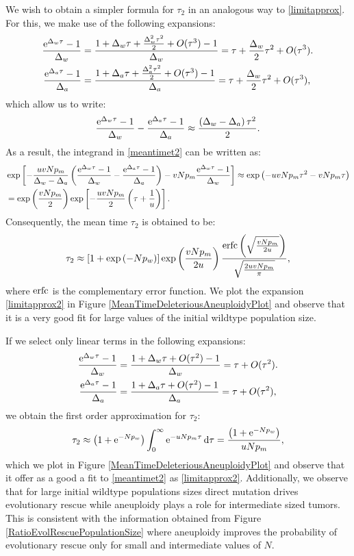 \documentclass[12pt]{extarticle}
\renewcommand{\d}{{\rm d}}
\newcommand{\e}{{\rm e}}
\newcommand{\erfc}{{\rm erfc}}
\begin{document}
We wish to obtain a simpler formula for $\tau_2$ in an analogous way to \eqref{limitapprox}. For this, we make use of the following expansions:
\begin{align*}
\frac{\e^{\Delta_w\tau}-1}{\Delta_w}&=\frac{1+\Delta_w\tau+\frac{\Delta_w^2\tau^2}{2}+O(\tau^3)-1}{\Delta_w}=\tau+\frac{\Delta_w}{2}\tau^2+O(\tau^3).\\
\frac{\e^{\Delta_a\tau}-1}{\Delta_a}&=\frac{1+\Delta_a\tau+\frac{\Delta_a^2\tau^2}{2}+O(\tau^3)-1}{\Delta_a}=\tau+\frac{\Delta_w}{2}\tau^2+O(\tau^3),
\end{align*}
which allow us to write:
\begin{equation*}
\frac{\e^{\Delta_w\tau}-1}{\Delta_w}-\frac{\e^{\Delta_a\tau}-1}{\Delta_a}\approx\frac{\left(\Delta_w-\Delta_a\right)\tau^2}{2}.
\end{equation*}
As a result, the integrand in \eqref{meantimet2} can be written as:
\begin{align*}
&\exp\left[-\frac{uvNp_m}{\Delta_w-\Delta_a}\left(\frac{\e^{\Delta_w\tau}-1}{\Delta_w}-\frac{\e^{\Delta_a\tau}-1}{\Delta_a}\right)-vNp_m\frac{\e^{\Delta_w\tau}-1}{\Delta_w}\right]\approx\exp\left(-uvNp_m\tau^2-vNp_m\tau\right)\\
&=\exp\left(\frac{vNp_m}{2}\right)\exp\left[-\frac{uvNp_m}{2}\left(\tau+\frac{1}{u}\right)\right].
\end{align*}
Consequently, the mean time $\tau_2$ is obtained to be:
\begin{align}\label{limitapprox2}
\tau_2\approx\left[1+\exp\left(-Np_w\right)\right]\exp\left(\frac{vNp_m}{2u}\right)\frac{\erfc\left(\sqrt{\frac{vNp_m}{2u}}\right)}{\sqrt{\frac{2uvNp_m}{\pi}}},
\end{align}
where $\erfc$ is the complementary error function. We plot the expansion \eqref{limitapprox2} in Figure \ref{MeanTimeDeleteriousAneuploidyPlot} and observe that it is a very good fit for large values of the initial wildtype population size.

If we select only linear terms in the following expansions:
\begin{align*}
\frac{\e^{\Delta_w\tau}-1}{\Delta_w}&=\frac{1+\Delta_w\tau+O(\tau^2)-1}{\Delta_w}=\tau+O(\tau^2).\\
\frac{\e^{\Delta_a\tau}-1}{\Delta_a}&=\frac{1+\Delta_a\tau+O(\tau^2)-1}{\Delta_a}=\tau+O(\tau^2),
\end{align*}
we obtain the first order approximation for $\tau_2$:
\begin{align}\label{limitapprox3}
\tau_2\approx\left(1+\e^{-Np_w}\right)\int_0^\infty\e^{-uNp_m\tau}\,\d\tau=\frac{\left(1+\e^{-Np_w}\right)}{uNp_m},
\end{align}
which we plot in Figure \ref{MeanTimeDeleteriousAneuploidyPlot} and observe that it offer as a good a fit to \eqref{meantimet2} as \eqref{limitapprox2}. Additionally, we observe that for large initial wildtype populations sizes direct mutation drives evolutionary rescue while aneuploidy plays a role for intermediate sized tumors. This is consistent with the information obtained from Figure \ref{RatioEvolRescuePopulationSize} where aneuploidy improves the probability of evolutionary rescue only  for small and intermediate values of $N$.
\end{document}
